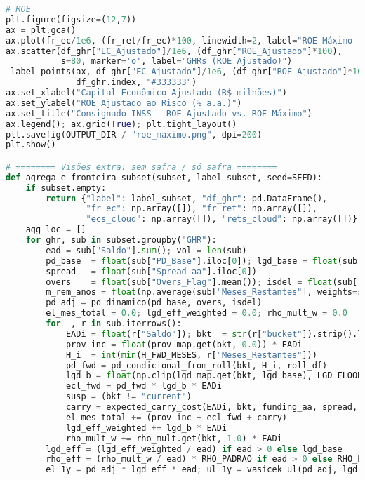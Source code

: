 \documentclass[11pt,a4paper]{article}
\newcommand{\1}{\mathbf{1}}
\begin{document}
\begin{lstlisting}[language=Python, caption={risk_frontier.py}]
# ROE
plt.figure(figsize=(12,7))
ax = plt.gca()
ax.plot(fr_ec/1e6, (fr_ret/fr_ec)*100, linewidth=2, label="ROE Máximo (Fronteira)")
ax.scatter(df_ghr["EC_Ajustado"]/1e6, (df_ghr["ROE_Ajustado"]*100),
           s=80, marker='o', label="GHRs (ROE Ajustado)")
_label_points(ax, df_ghr["EC_Ajustado"]/1e6, (df_ghr["ROE_Ajustado"]*100),
              df_ghr.index, "#333333")
ax.set_xlabel("Capital Econômico Ajustado (R$ milhões)")
ax.set_ylabel("ROE Ajustado ao Risco (% a.a.)")
ax.set_title("Consignado INSS – ROE Ajustado vs. ROE Máximo")
ax.legend(); ax.grid(True); plt.tight_layout()
plt.savefig(OUTPUT_DIR / "roe_maximo.png", dpi=200)
plt.show()

# ======== Visões extra: sem safra / só safra ========
def agrega_e_fronteira_subset(subset, label_subset, seed=SEED):
    if subset.empty:
        return {"label": label_subset, "df_ghr": pd.DataFrame(),
                "fr_ec": np.array([]), "fr_ret": np.array([]),
                "ecs_cloud": np.array([]), "rets_cloud": np.array([])}
    agg_loc = []
    for ghr, sub in subset.groupby("GHR"):
        ead = sub["Saldo"].sum(); vol = len(sub)
        pd_base  = float(sub["PD_Base"].iloc[0]); lgd_base = float(sub["LGD_Base"].iloc[0])
        spread   = float(sub["Spread_aa"].iloc[0])
        overs    = float(sub["Overs_Flag"].mean()); isdel = float(sub["IsDelayed_Flag"].mean())
        m_rem_anos = float(np.average(sub["Meses_Restantes"], weights=sub["Saldo"]) / 12.0) if ead > 0 else 0.0
        pd_adj = pd_dinamico(pd_base, overs, isdel)
        el_mes_total = 0.0; lgd_eff_weighted = 0.0; rho_mult_w = 0.0
        for _, r in sub.iterrows():
            EADi = float(r["Saldo"]); bkt  = str(r["bucket"]).strip().lower()
            prov_inc = float(prov_map.get(bkt, 0.0)) * EADi
            H_i  = int(min(H_FWD_MESES, r["Meses_Restantes"]))
            pd_fwd = pd_condicional_from_roll(bkt, H_i, roll_df)
            lgd_b = float(np.clip(lgd_map.get(bkt, lgd_base), LGD_FLOOR, LGD_CAP))
            ecl_fwd = pd_fwd * lgd_b * EADi
            susp = (bkt != "current")
            carry = expected_carry_cost(EADi, bkt, funding_aa, spread, months=H_i, opex_map=opex_map, suspende_accrual=susp)
            el_mes_total += (prov_inc + ecl_fwd + carry)
            lgd_eff_weighted += lgd_b * EADi
            rho_mult_w += rho_mult.get(bkt, 1.0) * EADi
        lgd_eff = (lgd_eff_weighted / ead) if ead > 0 else lgd_base
        rho_eff = (rho_mult_w / ead) * RHO_PADRAO if ead > 0 else RHO_PADRAO
        el_1y = pd_adj * lgd_eff * ead; ul_1y = vasicek_ul(pd_adj, lgd_eff, ead, rho_eff, Z_ALPHA)

\end{lstlisting}
\end{document}
